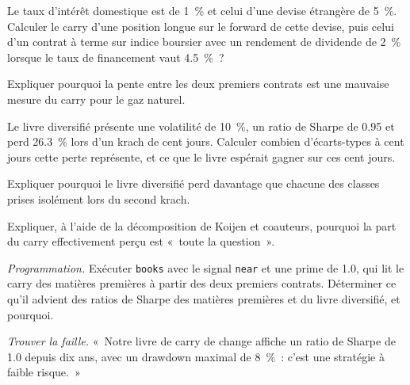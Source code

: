 \begin{exercise}[$\star$]\label{exo:s1:carry-across-asset-classes:2}
Le taux d'intérêt domestique est de 1~\% et celui d'une devise étrangère de 5~\%. Calculer le carry d'une position longue sur le forward de cette devise, puis celui d'un
contrat à terme sur indice boursier avec un rendement de dividende de 2~\% lorsque le taux de financement vaut 4.5~\%~?
\end{exercise}

\begin{exercise}[$\star$]\label{exo:s1:carry-across-asset-classes:3}
Expliquer pourquoi la pente entre les deux premiers contrats est une mauvaise mesure du carry pour le gaz naturel.
\end{exercise}

\begin{exercise}[$\star\star$]\label{exo:s1:carry-across-asset-classes:4}
Le livre diversifié présente une volatilité de 10~\%, un ratio de Sharpe de 0.95 et perd 26.3~\% lors d'un krach
de cent jours. Calculer combien d'écarts-types à cent jours cette perte représente, et ce que le livre espérait gagner sur ces cent jours.
\end{exercise}

\begin{exercise}[$\star\star$]\label{exo:s1:carry-across-asset-classes:5}
Expliquer pourquoi le livre diversifié perd davantage que chacune des classes prises isolément lors du second krach.
\end{exercise}

\begin{exercise}[$\star\star$]\label{exo:s1:carry-across-asset-classes:6}
Expliquer, à l'aide de la décomposition de Koijen et coauteurs, pourquoi la part du carry effectivement perçu est «~toute la question~».
\end{exercise}

\begin{exercise}[$\star\star\star$]\label{exo:s1:carry-across-asset-classes:7}
\emph{Programmation.} Exécuter \texttt{books} avec le signal \texttt{near} et une prime de 1.0, qui lit le carry des matières premières à partir des deux premiers contrats.
Déterminer ce qu'il advient des ratios de Sharpe des matières premières et du livre diversifié, et pourquoi.
\end{exercise}

\begin{exercise}[$\star\star\star$]\label{exo:s1:carry-across-asset-classes:8}
\emph{Trouver la faille.} «~Notre livre de carry de change affiche un ratio de Sharpe de 1.0 depuis dix ans, avec un drawdown maximal de 8~\%~: c'est une stratégie à faible risque.~»
\end{exercise}

